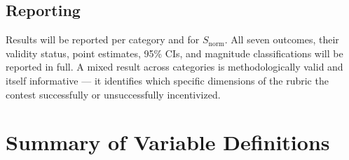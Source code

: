 \documentclass[11pt]{article}
\begin{document}
\subsection{Reporting}

Results will be reported per category and for $S_{\text{norm}}$. All seven outcomes, their validity status, point estimates, 95\% CIs, and magnitude classifications will be reported in full. A mixed result across categories is methodologically valid and itself informative --- it identifies which specific dimensions of the rubric the contest successfully or unsuccessfully incentivized.

\section{Summary of Variable Definitions}
\end{document}
